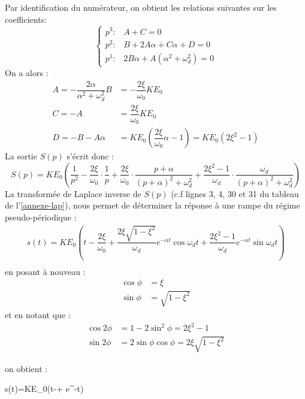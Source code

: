 Par identification du numérateur,
on obtient les relations suivantes sur les coefficients:
$$
\begin{cases}
    p^3:\,\,\,\,\,A+C=0\\
    p^2:\,\,\,\,\,B+2A\alpha+C\alpha+D=0\\
    p^1:\,\,\,\,\,2B\alpha+A(\alpha^2+\omega_d^2)=0
\end{cases}
$$
On a alors :
\begin{align*}
    A=-\dfrac{2\alpha}{\alpha^2+\omega_d^2}B&=-\dfrac{2\xi}{\omega_0}KE_0\\
    C=-A&=\dfrac{2\xi}{\omega_0}KE_0\\
    D=-B-A\alpha&=KE_0\left(\dfrac{2\xi}{\omega_0}\alpha-1\right)=KE_0(2\xi^2-1)
\end{align*}
La sortie $S(p)$ s'écrit donc :
$$
S(p)=KE_0\left(\dfrac{1}{p^2}-\dfrac{2\xi}{\omega_0}\cdot
               \dfrac{1}{p}+\dfrac{2\xi}{\omega_0}\cdot
			   \dfrac{p+\alpha}{(p+\alpha)^2+\omega_d^2}+
			   \dfrac{2\xi^2-1}{\omega_d}\cdot\dfrac{\omega_d}
			   {(p+\alpha)^2+\omega_d^2}\right)
$$
La transformée de Laplace inverse de $S(p)$ (c.f lignes 3, 4, 30 
et 31 du tableau de l'\cref{annexe-lap}), nous permet de déterminer la 
réponse à une rampe du régime pseudo-périodique :
\begin{align*}
s(t)=KE_0\left(t-\dfrac{2\xi}{\omega_0}+
\dfrac{2\xi\sqrt{1-\xi^2}}{\omega_d}
e^{-\alpha t}\cos{\omega_d t}+
\dfrac{2\xi^2-1}{\omega_d}e^{-\alpha t}\sin{\omega_d t}
\right)\\
\end{align*}
en posant à nouveau : 
\begin{align*}
    \cos{\phi}&=\xi\\
    \sin{\phi}&=\sqrt{1-\xi^2}
\end{align*}
et en notant que :
\begin{align*}
    \cos{2\phi}&=1-2\sin^2\phi=2\xi^2-1\\
    \sin{2\phi}&=2\sin\phi\cos\phi=2\xi\sqrt{1-\xi^2}
\end{align*}

on obtient :
\begin{bequation}
s(t)=KE_0\left(t-+
	     e^{-\alpha t}\right)
\end{bequation}

